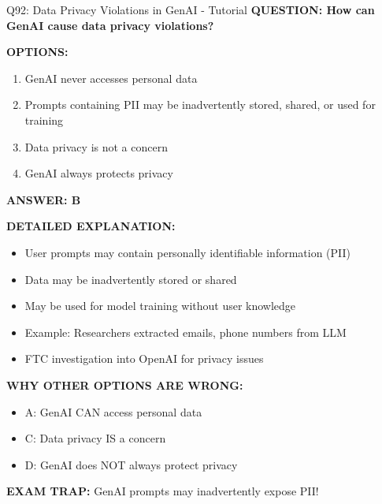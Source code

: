 \documentclass[8pt]{beamer}
\begin{document}
	\begin{frame}{Q92: Data Privacy Violations in GenAI - Tutorial}
		\fontsize{6.5}{7.5}\selectfont
		\textbf{QUESTION: How can GenAI cause data privacy violations?}
		
		\vspace{0.1cm}
		\textbf{OPTIONS:}
		\begin{enumerate}
			\item GenAI never accesses personal data
			\item Prompts containing PII may be inadvertently stored, shared, or used for training
			\item Data privacy is not a concern
			\item GenAI always protects privacy
		\end{enumerate}
		
		\vspace{0.1cm}
		\textcolor{myblue}{\textbf{ANSWER: B}}
		
		\vspace{0.1cm}
		\textbf{DETAILED EXPLANATION:}
		\begin{itemize}
			\item User prompts may contain personally identifiable information (PII)
			\item Data may be inadvertently stored or shared
			\item May be used for model training without user knowledge
			\item Example: Researchers extracted emails, phone numbers from LLM
			\item FTC investigation into OpenAI for privacy issues
		\end{itemize}
		
		\vspace{0.1cm}
		\textcolor{myred}{\textbf{WHY OTHER OPTIONS ARE WRONG:}}
		\begin{itemize}
			\item \textcolor{myred}{A:} GenAI CAN access personal data
			\item \textcolor{myred}{C:} Data privacy IS a concern
			\item \textcolor{myred}{D:} GenAI does NOT always protect privacy
		\end{itemize}
		
		\textcolor{myred}{\textbf{EXAM TRAP:}} GenAI prompts may \textcolor{myblue}{inadvertently expose PII}!
	\end{frame}
	
\end{document}
